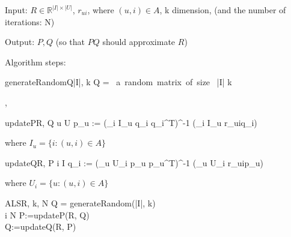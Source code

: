 \documentclass[12pt]{article}
\begin{document}
\noindent
Input: $R \in \mathbb{R}^{|I| \times |U|}$, $r_{ui}$, where $(u,i) \in A$, k dimension, (and the number of iterations: N)

\noindent
Output: $P,Q$ (so that $PQ$ should approximate $R$)

\noindent
Algorithm steps: \\

\begin{pseudocode}{generateRandomQ}{|I|, k}
  Q = \mbox{ a random matrix of size } |I| \times k
\end{pseudocode},

\begin{pseudocode}{updateP}{R, Q}
\FOREACH  u \in U \DO
  p_u := (\sum_{i \in I_u} q_i q_i^T)^{-1} (\sum_{i \in I_u} r_{ui}q_i)
\end{pseudocode}

where $I_u = \{i: (u,i) \in A\}$

\begin{pseudocode}{updateQ}{R, P}
\FOREACH i \in I \DO
  q_i := (\sum_{u \in U_i} p_u p_u^T)^{-1} (\sum_{u \in U_i} r_{ui}p_u)
\end{pseudocode}

where $U_i = \{u: (u,i) \in A\}$

\begin{pseudocode}{ALS}{R, k, N}
  Q = generateRandom(|I|, k) \\
  \FOR i  \TO N \DO
    \BEGIN
      P:=updateP(R, Q) \\
      Q:=updateQ(R, P)
    \END
\end{pseudocode}
\end{document}
